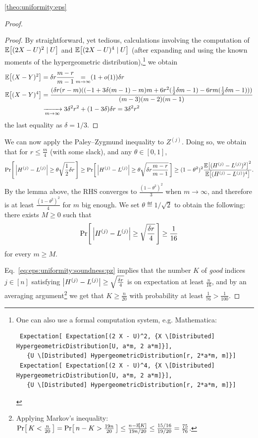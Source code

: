 \begin{proofof}{\cref{theo:uniformity:eps}}
\begin{proof}
\begin{proof}
By straightforward, yet tedious, calculations involving the computation of $\mathbb{E}\!\left[(2X-U)^2\mid U \right]$ and $\mathbb{E}\!\left[(2X-U)^4\mid U \right]$ (after expanding and using the known moments of the hypergeometric distribution),\footnote{One can also use a formal computation system, e.g. Mathematica:\scriptsize
\begin{verbatim}
 Expectation[ Expectation[(2 X - U)^2, {X \[Distributed] HypergeometricDistribution[U, a*m, 2 a*m]}],
   {U \[Distributed] HypergeometricDistribution[r, 2*a*m, m]}]
 Expectation[ Expectation[(2 X - U)^4, {X \[Distributed] HypergeometricDistribution[U, a*m, 2 a*m]}],
   {U \[Distributed] HypergeometricDistribution[r, 2*a*m, m]}]
\end{verbatim}
}{} we obtain
\begin{align*}
  \mathbb{E}\!\left[(X-Y)^2\right] &= \delta r \frac{m-r}{m-1} \operatorname*{=}_{m\to\infty} (1+o(1)) \delta r \\
  \mathbb{E}\!\left[(X-Y)^4\right] &= \frac{(\delta r (r - m) ((-1 + 3\delta (m-1) - m) m + 6 r^2 (\frac{1}{2}\delta m-1) - 6 r m (\frac{1}{2}\delta m-1)))}{(m-3) (m-2) (m-1)} \\
  &\xrightarrow[m\to\infty]{} 3\delta^2 r^2 + (1 - 3\delta) \delta r = 3\delta^2 r^2
\end{align*}
the last equality as $\delta=1/3$.
  \end{proof}
  We can now apply the Paley--Zygmund inequality to $Z^{(j)}$. Doing so, we obtain that for $r \leq \frac{m}{4}$ (with some slack), and any $\theta\in[0,1]$,
  \[
      \Pr\!\left[\,  \left\lvert H^{(j)} - L^{(j)} \right\rvert \geq \theta \sqrt{\frac{1}{2}\delta r} \, \right] 
      \geq
      \Pr\!\left[\,  \left\lvert H^{(j)} - L^{(j)} \right\rvert \geq \theta \sqrt{\delta r \frac{m-r}{m-1}} \, \right] \geq (1-\theta^2)^2\frac{\mathbb{E}\!\left[(H^{(j)} - L^{(j)})^2\right]^2}{\mathbb{E}\!\left[(H^{(j)} - L^{(j)})^4\right]}.
  \]
  By the lemma above, the RHS converges to $\frac{(1-\theta^2)^2}{3}$ when $m\to \infty$, and therefore is at least $\frac{(1-\theta^2)^2}{4}$ for $m$ big enough. We set $\theta \eqdef 1/\sqrt{2}$ to obtain the following: there exists $M\geq 0$ such that
  \begin{equation}\label{eq:eps:uniformity:soundness:pz}
    \Pr\!\left[\,  \left\lvert H^{(j)} - L^{(j)} \right\rvert \geq \sqrt{\frac{\delta r}{4}} \, \right] \geq \frac{1}{16}
  \end{equation}
  for every $m\geq M$.
  
  Eq.~\eqref{eq:eps:uniformity:soundness:pz} implies that the number $K$ of \emph{good} indices $j\in[n]$ satisfying $\left\lvert H^{(j)} - L^{(j)} \right\rvert \geq \sqrt{\frac{\delta r}{4}}$ is on expectation at least $\frac{n}{16}$, and by an averaging argument\footnote{Applying Markov's inequality: $\Pr\!\left[\, K < \frac{n}{20}\, \right] = \Pr\!\left[\, n-K > \frac{19n}{20}\, \right] \leq \frac{n-\mathbb{E}\!\left[K\right]}{19n/20} \leq  \frac{15/16}{19/20} = \frac{75}{76}$.}  we get that $K\geq \frac{n}{20}$ with probability at least $\frac{1}{76} > \frac{1}{100}$.
  

\end{proof}
\end{proofof}
